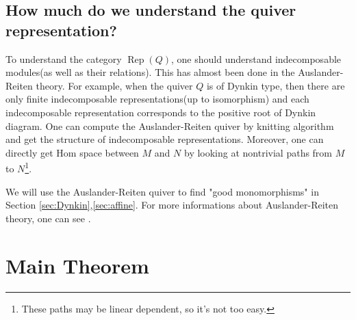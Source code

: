 \documentclass[reqno,11pt]{amsart}
\numberwithin{equation}{section}
\theoremstyle{plain}
\theoremstyle{plain}
\numberwithin{equation}{section}
\theoremstyle{remark}
\DeclareMathOperator{\Rep}{\operatorname{Rep}}
\begin{document}
\subsection{How much do we understand the quiver representation?}
To understand the category $\Rep(Q)$, one should understand indecomposable modules(as well as their relations). This has almost been done in the Auslander-Reiten theory. For example, when the quiver $Q$ is of Dynkin type, then there are only finite indecomposable representations(up to isomorphism) and each indecomposable representation corresponds to the positive root of Dynkin diagram. One can compute the Auslander-Reiten quiver by knitting algorithm and get the structure of indecomposable representations. Moreover, one can directly get Hom space between $M$ and $N$ by looking at nontrivial paths from $M$ to $N$\footnote{These paths may be linear dependent, so it's not too easy.}.

We will use the Auslander-Reiten quiver to find "good monomorphisms" in Section \ref{sec:Dynkin},\ref{sec:affine}. For more informations about Auslander-Reiten theory, one can see \cite{crawley1992lectures}.

\section{Main Theorem}\label{sec:mainthm}
   
\end{document}
